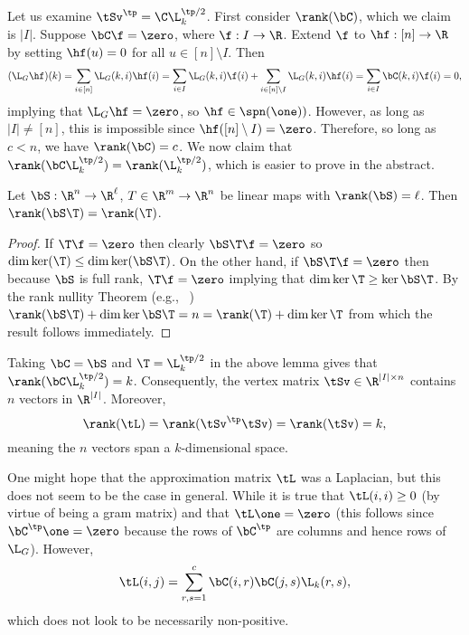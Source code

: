 Let us examine $\tSv^\tp=\C\L_k^{\tp/2}$. First consider $\rank(\bC)$, which we claim is $|I|$. Suppose $\bC\f=\zero$, where $\f:I \to \R$. Extend $\f$ to $\hf:[n]\to\R$ by setting $\hf(u)=0$ for all $u\in [n]\setminus I$. Then 
\[(\L_G\hf)(k) = \sum_{i\in[n]}\L_G(k,i)\hf(i) = \sum_{i\in I}\L_G(k,i) \f(i) + \sum_{i\in[n]\setminus I} \L_G(k,i)\hf(i) = \sum_{i\in I}\bC(k,i) \f(i) = 0,\]
implying that $\L_G\hf=\zero$, so $\hf\in\spn(\one))$. However, as long as $|I|\neq[n]$, this is impossible since  $\hf([n]\setminus I)=\zero$. Therefore, so long as $c<n$, we have $\rank(\bC) = c$. 
We now claim that $\rank(\bC\L_k^{\tp/2}) = \rank(\L_k^{\tp/2})$, which is easier to prove in the abstract. 

\begin{lemma}
	Let $\bS:\R^n\to\R^\ell$, $T\in\R^m\to\R^n$ be linear maps with $\rank(\bS)=\ell$. Then $\rank(\bS\T) = \rank(\T)$. 
\end{lemma}
\begin{proof}
	If $\T\f=\zero$ then clearly $\bS\T\f=\zero$ so $\dim\ker(\T)\leq \dim\ker(\bS\T)$. On the other hand, if $\bS\T\f=\zero$ then because $\bS$ is full rank, $\T\f=\zero$ implying that $\dim \ker \T\ge \ker\bS\T$. 	By the rank nullity Theorem (e.g., ~\cite{axler1997linear}) $\rank(\bS\T) + \dim\ker \bS\T = n = \rank(\T) + \dim\ker\T$ from which the result follows immediately. 
\end{proof}

Taking $\bC=\bS$ and $\T=\L_k^{\tp/2}$ in the above lemma gives that $\rank(\bC\L_k^{\tp/2})=k$. Consequently, the vertex matrix $\tSv\in\R^{|I|\times n}$ contains $n$ vectors in $\R^{|I|}$. Moreover, 
\[\rank(\tL) = \rank(\tSv^\tp \tSv) = \rank(\tSv)=k,\]
meaning the $n$ vectors span a $k$-dimensional space. 

One might hope that the approximation matrix $\tL$ was a Laplacian, but this does not seem to be the case in general. While it is true that $\tL(i,i)\geq 0$ (by virtue of being a gram matrix) and that $\tL\one=\zero$ (this follows since $\bC^\tp\one =\zero$ because the rows of $\bC^\tp$ are columns and hence rows of $\L_G$). However, 
\[\tL(i,j) = \sum_{r,s=1}^c \bC(i,r)\bC(j,s)\L_k(r,s),\]
which does not look to be necessarily non-positive. 





